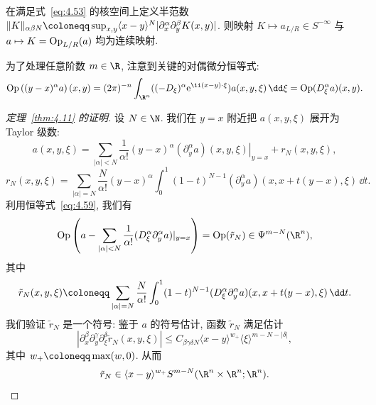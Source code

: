 \begin{remark}[残余算子约化的拓扑连续性]\label{rem:4.14}
在满足式~\eqref{eq:4.53} 的核空间上定义半范数 $\|K\|_{\alpha\beta N} \defeq \sup_{x, y} \langle x - y \rangle^N |\partial_x^\alpha \partial_y^\beta K(x, y)|$. 则映射 $K \mapsto a_{L/R} \in S^{-\infty}$ 与 $a \mapsto K = \operatorname{Op}_{L/R}(a)$ 均为连续映射.
\end{remark}

为了处理任意阶数 $m \in \R$, 注意到关键的对偶微分恒等式:
\begin{equation}\label{eq:4.59}
    \Op\left( (y - x)^\alpha a \right)(x, y) = (2\pi)^{-n} \int_{\R^n} ((-D_\xi)^\alpha \ee^{\ii(x-y)\cdot\xi}) a(x, y, \xi) \,\dd\xi = \Op(D_\xi^\alpha a)(x, y).
\end{equation}

\begin{proof}[定理~\ref{thm:4.11} 的证明]
设 $N \in \N$. 我们在 $y = x$ 附近把 $a(x, y, \xi)$ 展开为 Taylor 级数:
\[
    a(x, y, \xi) = \sum_{|\alpha| < N} \frac{1}{\alpha!} (y - x)^\alpha \left. (\partial_y^\alpha a)(x, y, \xi) \right|_{y = x} + r_N(x, y, \xi),
\]
\begin{equation}\label{eq:4.60}
    r_N(x, y, \xi) = \sum_{|\alpha| = N} \frac{N}{\alpha!} (y - x)^\alpha \int_0^1 (1 - t)^{N-1} (\partial_y^\alpha a)(x, x + t(y - x), \xi) \,\dd t.
\end{equation}
利用恒等式~\eqref{eq:4.59}, 我们有
\begin{equation}\label{eq:4.61}
    \Op\left( a - \sum_{|\alpha| < N} \frac{1}{\alpha!} (D_\xi^\alpha \partial_y^\alpha a)|_{y=x} \right) = \Op(\tilde{r}_N) \in \Psi^{m-N}(\R^n),
\end{equation}
其中
\begin{equation}\label{eq:4.62}
    \tilde{r}_N(x, y, \xi) \defeq \sum_{|\alpha| = N} \frac{N}{\alpha!} \int_0^1 (1 - t)^{N-1} (D_\xi^\alpha \partial_y^\alpha a)(x, x + t(y - x), \xi) \,\dd t.
\end{equation}
我们验证 $\tilde{r}_N$ 是一个符号: 鉴于 $a$ 的符号估计, 函数 $\tilde{r}_N$ 满足估计
\begin{equation}\label{eq:4.63}
    |\partial_x^\beta \partial_y^\gamma \partial_\xi^\delta \tilde{r}_N(x, y, \xi)| \le C_{\beta\gamma\delta N} \langle x - y \rangle^{w_+} \langle \xi \rangle^{m-N-|\delta|},
\end{equation}
其中 $w_+ \defeq \max(w, 0)$. 从而
\begin{equation}\label{eq:4.64}
    \tilde{r}_N \in \langle x - y \rangle^{w_+} S^{m-N}(\R^n \times \R^n; \R^n).
\end{equation}

\end{proof}
